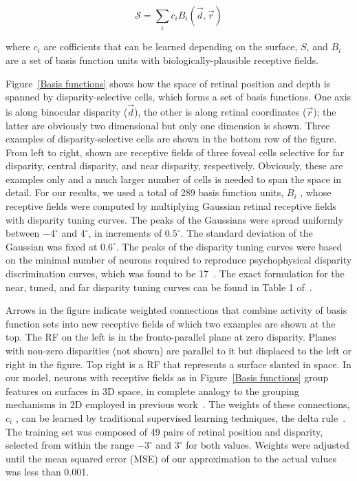 \begin{equation}
\mathcal{S} = \sum_{i}c_{i}B_{i}(\vec{d}, \vec{r})
\end{equation}

\noindent where $c_{i}$ are cofficients that can be learned depending on the surface, $S$, and $B_{i}$ are a set of basis function units with biologically-plausible receptive fields.

Figure~\ref{Basis functions}
%
%
shows how the space of retinal position and depth is spanned by disparity-selective cells, which forms a set of basis functions. One axis is along binocular disparity ($\vec{d}$), the other is along retinal coordinates ($\vec{r}$); the latter are obviously two dimensional but only one dimension is shown. Three examples of disparity-selective cells are shown in the bottom row of the figure. From left to right, shown are receptive fields of three foveal cells selective for far disparity, central disparity, and near disparity, respectively. Obviously, these are examples only and a much larger number of cells is needed to span the space in detail. For our results, we used a total of 289 basis function units, $B_{i}$ , whose receptive fields were computed by multiplying Gaussian retinal receptive fields with disparity tuning curves. The peaks of the Gaussians were spread uniformly between $-4^{\circ}$ and $4^{\circ}$, in increments of $0.5^{\circ}$. The standard deviation of the Gaussian was fixed at $0.6^{\circ}$. The peaks of the disparity tuning curves were based on the minimal number of neurons required to reproduce psychophysical disparity discrimination curves, which was found to be 17~\citep{Lehky_Sejnowski90}. The exact formulation for the near, tuned, and far disparity tuning curves can be found in Table 1 of~\citet{Lehky_Sejnowski90}.

Arrows in the figure indicate weighted connections that combine activity of basis function sets into new receptive fields of which two examples are shown at the top. The RF on the left is in the fronto-parallel plane at zero disparity. Planes with non-zero disparities (not shown) are parallel to it but displaced to the left or right in the figure. Top right is a RF that represents a surface slanted in space. In our model, neurons with receptive fields as in Figure~\ref{Basis functions} group features on surfaces in 3D space, in complete analogy to the grouping mechanisms in 2D employed in previous work~\citep{Craft_etal07,Mihalas_etal11b}. The weights of these connections, $c_{i}$ , can be learned by traditional supervised learning techniques, \eg the delta rule~\citep{Widrow_Hoff60}. The training set was composed of 49 pairs of retinal position and disparity, selected from within the range $-3^\circ{}$ and $3^\circ{}$ for both values. Weights were adjusted until the mean squared error (MSE) of our approximation to the actual values was less than 0.001.

